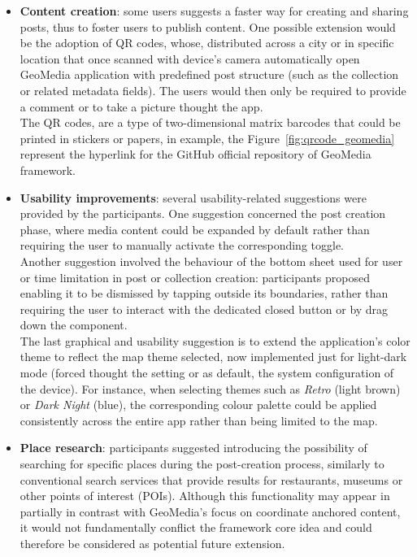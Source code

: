 \begin{itemize}
    \item \textbf{Content creation}: some users suggests a faster way for creating and sharing posts, thus to foster users to publish content. One possible extension would be the adoption of QR codes, whose, distributed across a city or in specific location that once scanned with device's camera automatically open GeoMedia application with predefined post structure (such as the collection or related metadata fields). The users would then only be required to provide a comment or to take a picture thought the app. \\
    The QR codes, are a type of two-dimensional matrix barcodes that could be printed in stickers or papers, in example, the Figure~\ref{fig:qrcode_geomedia} represent the hyperlink for the GitHub official repository of GeoMedia framework.    
    
    \item \textbf{Usability improvements}: several usability-related suggestions were provided by the participants. One suggestion concerned the post creation phase, where media content could be expanded by default rather than requiring the user to manually activate the corresponding toggle. \\
    Another suggestion involved the behaviour of the bottom sheet used for user or time limitation in post or collection creation: participants proposed enabling it to be dismissed by tapping outside its boundaries, rather than requiring the user to interact with the dedicated closed button or by drag down the component. \\
    The last graphical and usability suggestion is to extend the application's color theme to reflect the map theme selected, now implemented just for light-dark mode (forced thought the setting or as default, the system configuration of the device). For instance, when selecting themes such as \textit{Retro} (light brown) or \textit{Dark Night} (blue), the corresponding colour palette could be applied consistently across the entire app rather than being limited to the map.

    \item \textbf{Place research}: participants suggested introducing the possibility of searching for specific places during the post-creation process, similarly to conventional search services that provide results for restaurants, museums or other points of interest (POIs). Although this functionality may appear in partially in contrast with GeoMedia's focus on coordinate anchored content, it would not fundamentally conflict the framework core idea and could therefore be considered as potential future extension.
    

\end{itemize}
